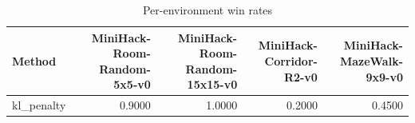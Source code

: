 \begin{table}[htbp]
\centering
\caption{Per-environment win rates}
\label{tab:per-env}
\begin{tabular}{lrrrr}
\toprule
\textbf{Method} & \textbf{MiniHack-Room-Random-5x5-v0} & \textbf{MiniHack-Room-Random-15x15-v0} & \textbf{MiniHack-Corridor-R2-v0} & \textbf{MiniHack-MazeWalk-9x9-v0} \\
\midrule
kl\_penalty & 0.9000 & 1.0000 & 0.2000 & 0.4500 \\
\bottomrule
\end{tabular}
\end{table}